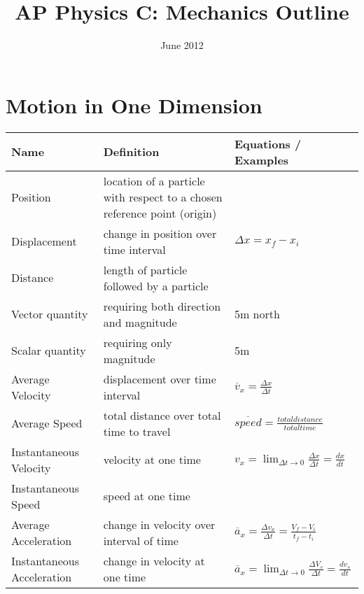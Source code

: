 \documentclass[11pt]{article}
\title{AP Physics C: Mechanics Outline}
\date{June 2012}
\begin{document}
\maketitle
\pagebreak

\section{Motion in One Dimension}
\begin{tabularx}{\textwidth}{l| X l}
    Name             & Definition                                                               & Equations / Examples \\ \hline
    Position         & location of a particle with respect to a chosen reference point (origin) & \\ \hline
    Displacement     & change in position over time interval                                    & $ \Delta x=x_{f} - x_{i} $ \bigstrut \\ \hline
    Distance         & length of particle followed by a particle                                & \\ \hline
    Vector quantity  & requiring both direction and magnitude                                   & 5m north \\ \hline
    Scalar quantity  & requiring only magnitude                                                 & 5m \\ \hline
    Average Velocity & displacement over time interval                                          & $ \overline{v}_{x} = \frac{ \Delta x}{ \Delta t } $ \bigstrut \\ \hline
    Average Speed    & total distance over total time to travel                                 & $ \overline{speed} = \frac{ total distance }{ total time } $ \bigstrut \\ \hline
    Instantaneous Velocity     & velocity at one time                                   & $ v_{x} = \lim_{ \Delta t \to 0} \frac{\Delta x}{\Delta t} = \frac{dx}{dt} $ \bigstrut \\ \hline
    Instantaneous Speed        & speed at one time                                      & \\ \hline
    Average Acceleration       & change in velocity over interval of time               & $ \overline{a}_{x} = \frac{\Delta v_{x}}{\Delta t} = \frac{V_{f}-V_{i}}{t_{f}-t_{i}} $ \bigstrut \\ \hline
    Instantaneous Acceleration & change in velocity at one time                         & $ \overline{a}_{x} = \lim_{\Delta t \to 0} \frac{\Delta V_{s}}{\Delta t} = \frac{dv_{s}}{dt} $ \bigstrut \\ \hline

\end{tabularx}
\end{document}
